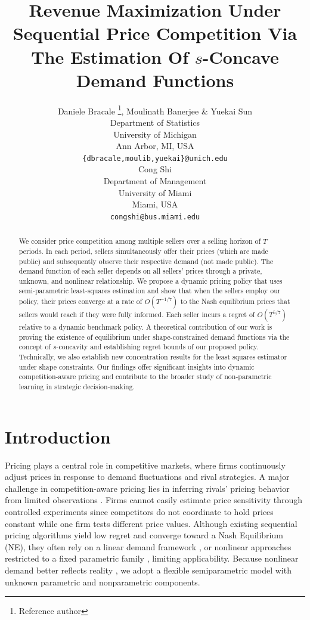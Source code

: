 \documentclass{article} %
\title{Revenue Maximization Under Sequential Price Competition Via The Estimation Of $s$-Concave Demand Functions}
\author{Daniele Bracale \thanks{Reference author},  Moulinath Banerjee \& Yuekai Sun \\
Department of Statistics\\
University of Michigan\\
Ann Arbor, MI, USA \\
\texttt{\{dbracale,moulib,yuekai\}@umich.edu} \\
\And
Cong Shi \\
Department of Management \\
University of Miami \\
Miami, USA \\
\texttt{congshi@bus.miami.edu}
}
\begin{document}
\maketitle

\begin{abstract}
We consider price competition among multiple sellers over a selling horizon of $T$ periods. In each period, sellers simultaneously offer their prices (which are made public) and subsequently observe their respective demand (not made public). The demand function of each seller depends on all sellers' prices through a private, unknown, and nonlinear relationship. We propose a dynamic pricing policy that uses semi-parametric least-squares estimation and show that when the sellers employ our policy, their prices converge at a rate of $O(T^{-1/7})$ to the Nash equilibrium prices that sellers would reach if they were fully informed. Each seller incurs a regret of $O(T^{5/7})$ relative to a dynamic benchmark policy. A theoretical contribution of our work is proving the existence of equilibrium under shape-constrained demand functions via the concept of $s$-concavity and establishing regret bounds of our proposed policy. Technically, we also establish new concentration results for the least squares estimator under shape constraints. Our findings offer significant insights into dynamic competition-aware pricing and contribute to the broader study of non-parametric learning in strategic decision-making.
\end{abstract}

\section{Introduction}\label{sec:Intro}

Pricing plays a central role in competitive markets, where firms continuously adjust prices in response to demand fluctuations and rival strategies. A major challenge in competition-aware pricing lies in inferring rivals’ pricing behavior from limited observations \citep{li2024lego}. Firms cannot easily estimate price sensitivity through controlled experiments since competitors do not coordinate to hold prices constant while one firm tests different price values. Although existing sequential pricing algorithms yield low regret and converge toward a Nash Equilibrium (NE), they often rely on a linear demand framework  \citep{kirman1975learning,li2024lego}, or nonlinear approaches restricted to a fixed parametric family \citep{goyal2023learning}, limiting applicability. Because nonlinear demand better reflects reality \citep{gallego2006price, wan2022nonlinear, wan2023conditions}, we adopt a flexible semiparametric model with unknown parametric and nonparametric components.
\end{document}
